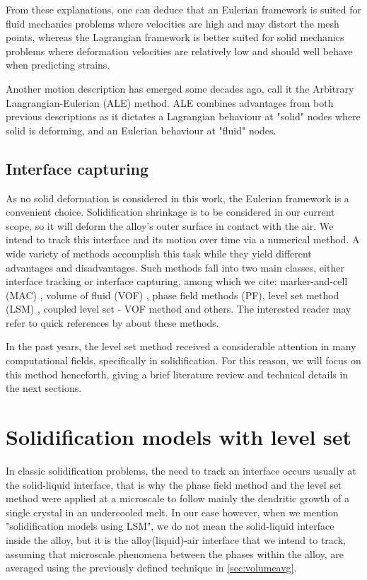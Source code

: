 From these explanations, one can deduce that an Eulerian framework is suited for fluid mechanics problems where 
velocities are high and may distort the mesh points, whereas the Lagrangian framework is better suited for solid mechanics 
problems where deformation velocities are relatively low and should well behave when predicting strains.

Another motion description has emerged some decades ago, \citet{hirt_arbitrary_1971} call it the Arbitrary Langrangian-Eulerian (ALE) method. 
ALE combines advantages from both previous descriptions as it dictates a Lagrangian behaviour at "solid" nodes where solid is deforming, and
an Eulerian behaviour at "fluid" nodes.
%
%
\subsection{Interface capturing}
As no solid deformation is considered in this work, the Eulerian framework is a convenient choice. Solidification shrinkage is 
to be considered in our current scope, so it will deform the alloy's outer surface in contact with the air.
We intend to track this interface and its motion over time via a numerical method. A wide variety of methods accomplish this 
task while they yield different advantages and disadvantages. Such methods fall into two main classes, either interface tracking
or interface capturing, among which we cite: marker-and-cell (MAC) \citep{harlow_numerical_1965}, volume of fluid (VOF) \citep{hirt_volume_1981}, 
phase field methods (PF), level set method (LSM) \citep{osher_fronts_1988}, coupled level set - VOF method and others. 
The interested reader may refer to quick references by \citet{prosperetti_navier-stokes_2002,maitre_review_2006} about these methods.

In the past years, the level set method received a considerable attention in many computational fields, specifically in solidification.
For this reason, we will focus on this method henceforth, giving a brief literature review and technical details in the next sections.
%
\section{Solidification models with level set}
In classic solidification problems, the need to track an interface occurs usually at the solid-liquid interface, that is why the phase field
method \citep{karma_phase-field_1996,boettinger_phase-field_2002} and the level set method \citep{chen_simple_1997,gibou_level_2003,tan_level_2007} 
were applied at a microscale to follow mainly the dendritic growth of a single crystal in an undercooled melt.
In our case however, when we mention "solidification models using LSM", we 
do not mean the solid-liquid interface inside the alloy, but it is the alloy(liquid)-air interface that we intend to track, assuming that microscale
phenomena between the phases within the alloy, are averaged using the previously defined technique in \cref{sec:volumeavg}.

